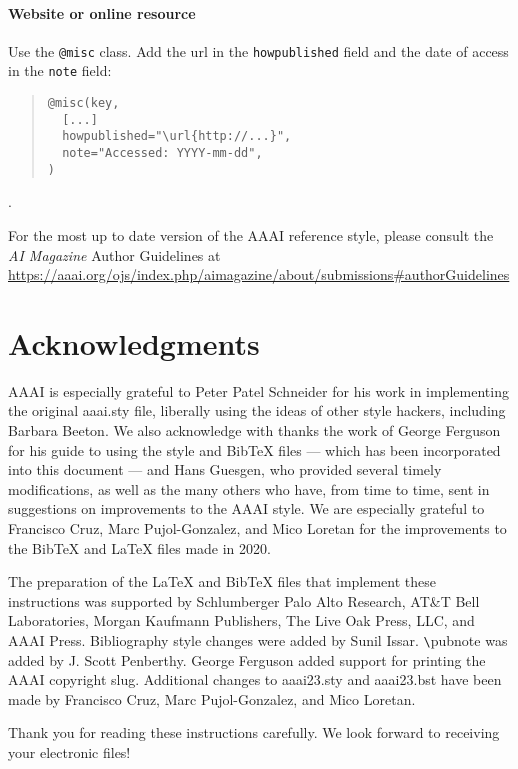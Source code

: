 \documentclass[letterpaper]{article} %
\begin{document}
\paragraph{Website or online resource~\nocite{c:23}} Use the \texttt{@misc} class. Add the url in the \texttt{howpublished} field and the date of access in the \texttt{note} field:
\begin{quote}
\begin{footnotesize}
\begin{verbatim}
@misc(key,
  [...]
  howpublished="\url{http://...}",
  note="Accessed: YYYY-mm-dd",
)
\end{verbatim}
\end{footnotesize}
\end{quote}
.

\vspace{.2em}
For the most up to date version of the AAAI reference style, please consult the \textit{AI Magazine} Author Guidelines at \url{https://aaai.org/ojs/index.php/aimagazine/about/submissions#authorGuidelines}


\section{Acknowledgments}
AAAI is especially grateful to Peter Patel Schneider for his work in implementing the original aaai.sty file, liberally using the ideas of other style hackers, including Barbara Beeton. We also acknowledge with thanks the work of George Ferguson for his guide to using the style and BibTeX files --- which has been incorporated into this document --- and Hans Guesgen, who provided several timely modifications, as well as the many others who have, from time to time, sent in suggestions on improvements to the AAAI style. We are especially grateful to Francisco Cruz, Marc Pujol-Gonzalez, and Mico Loretan for the improvements to the Bib\TeX{} and \LaTeX{} files made in 2020.

The preparation of the \LaTeX{} and Bib\TeX{} files that implement these instructions was supported by Schlumberger Palo Alto Research, AT\&T Bell Laboratories, Morgan Kaufmann Publishers, The Live Oak Press, LLC, and AAAI Press. Bibliography style changes were added by Sunil Issar. \verb+\+pubnote was added by J. Scott Penberthy. George Ferguson added support for printing the AAAI copyright slug. Additional changes to aaai23.sty and aaai23.bst have been made by Francisco Cruz, Marc Pujol-Gonzalez, and Mico Loretan.

\bigskip
\noindent Thank you for reading these instructions carefully. We look forward to receiving your electronic files!
\end{document}
